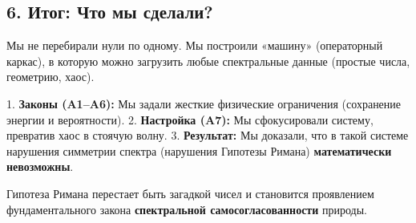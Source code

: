 \documentclass{article}
\numberwithin{equation}{section}
\theoremstyle{plain}
\theoremstyle{definition}
\theoremstyle{remark}
\begin{document}
\subsection*{6. Итог: Что мы сделали?}

Мы не перебирали нули по одному. Мы построили «машину» (операторный каркас), в которую можно загрузить любые спектральные данные (простые числа, геометрию, хаос).

1. \textbf{Законы (A1–A6):} Мы задали жесткие физические ограничения (сохранение энергии и вероятности).
2. \textbf{Настройка (A7):} Мы сфокусировали систему, превратив хаос в стоячую волну.
3. \textbf{Результат:} Мы доказали, что в такой системе нарушения симметрии спектра (нарушения Гипотезы Римана) \textbf{математически невозможны}.

Гипотеза Римана перестает быть загадкой чисел и становится проявлением фундаментального закона \textbf{спектральной самосогласованности} природы.

\clearpage
\end{document}
